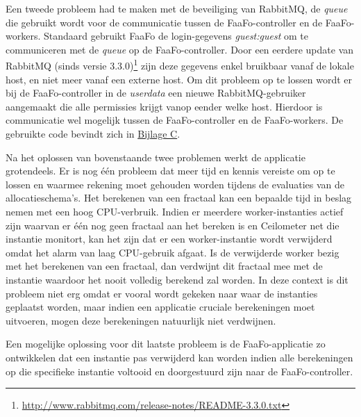 Een tweede probleem had te maken met de beveiliging van RabbitMQ, de \textit{queue} die gebruikt wordt voor de communicatie tussen de FaaFo-controller en de FaaFo-workers. Standaard gebruikt FaaFo de login-gegevens \textit{guest:guest} om te communiceren met de \textit{queue} op de FaaFo-controller. Door een eerdere update van RabbitMQ (sinds versie 3.3.0)\footnote{\url{http://www.rabbitmq.com/release-notes/README-3.3.0.txt}} zijn deze gegevens enkel bruikbaar vanaf de lokale host, en niet meer vanaf een externe host. Om dit probleem op te lossen wordt er bij de FaaFo-controller in de \textit{user\textunderscore data} een nieuwe RabbitMQ-gebruiker aangemaakt die alle permissies krijgt vanop eender welke host. Hierdoor is communicatie wel mogelijk tussen de FaaFo-controller en de FaaFo-workers. De gebruikte code bevindt zich in \hyperref[att:scripts]{Bijlage C}.

Na het oplossen van bovenstaande twee problemen werkt de applicatie grotendeels. Er is nog één probleem dat meer tijd en kennis vereiste om op te lossen en waarmee rekening moet gehouden worden tijdens de evaluaties van de allocatieschema's. Het berekenen van een fractaal kan een bepaalde tijd in beslag nemen met een hoog CPU-verbruik. Indien er meerdere worker-instanties actief zijn waarvan er één nog geen fractaal aan het bereken is en Ceilometer net die instantie monitort, kan het zijn dat er een worker-instantie wordt verwijderd omdat het alarm van laag CPU-gebruik afgaat. Is de verwijderde worker bezig met het berekenen van een fractaal, dan verdwijnt dit fractaal mee met de instantie waardoor het nooit volledig berekend zal worden. In deze context is dit probleem niet erg omdat er vooral wordt gekeken naar waar de instanties geplaatst worden, maar indien een applicatie cruciale berekeningen moet uitvoeren, mogen deze berekeningen natuurlijk niet verdwijnen.

Een mogelijke oplossing voor dit laatste probleem is de FaaFo-applicatie zo ontwikkelen dat een instantie pas verwijderd kan worden indien alle berekeningen op die specifieke instantie voltooid en doorgestuurd zijn naar de FaaFo-controller.